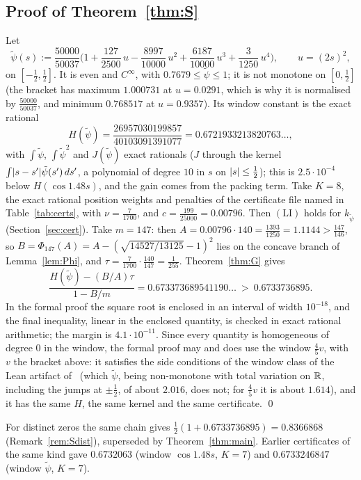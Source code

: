 \subsection{Proof of Theorem~\ref{thm:S}}
Let
\[
\tilde\psi(s):=\frac{50000}{50037}\Big(1+\frac{127}{2500}\,u-\frac{8997}{10000}\,u^2+\frac{6187}{10000}\,u^3+\frac{3}{1250}\,u^4\Big),\qquad u=(2s)^2,
\]
on $[-\frac12,\frac12]$. It is even and $C^\infty$, with $0.7679\le\tilde\psi\le1$; it is not monotone on $[0,\frac12]$ (the bracket has maximum
$1.000731$ at $u=0.0291$, which is why it is normalised by $\frac{50000}{50037}$, and minimum $0.768517$ at $u=0.9357$). Its window constant is the
exact rational
\[
H(\tilde\psi)=\frac{26957030199857}{40103091391077}=0.6721933213820763\ldots,
\]
with $\int\tilde\psi$, $\int\tilde\psi^2$ and $J(\tilde\psi)$ exact rationals ($J$ through the kernel $\int\lvert s-s'\rvert\tilde\psi(s')\,ds'$, a
polynomial of degree $10$ in $s$ on $\lvert s\rvert\le\frac12$); this is $2.5\cdot10^{-4}$ below $H(\cos1.48s)$, and the gain comes from the packing
term. Take $K=8$, the exact rational position weights and penalties of the certificate file named in Table~\ref{tab:certs}, with
$\nu=\frac7{1700}$, and $c=\frac{199}{25000}=0.00796$. Then $(\mathrm{LI})$ holds for $k_{\tilde\psi}$ (Section~\ref{sec:cert}). Take $m=147$: then
$A=0.00796\cdot140=\frac{1393}{1250}=1.1144>\frac{147}{146}$, so $B=\Phi_{147}(A)=A-(\sqrt{14527/13125}-1)^2$ lies on the concave branch of
Lemma~\ref{lem:Phi}, and $\tau=\frac{7}{1700}\cdot\frac{140}{147}=\frac1{255}$. Theorem~\ref{thm:G} gives
\[
\frac{H(\tilde\psi)-(B/A)\tau}{1-B/m}=0.673373689541190\ldots\ >\ 0.6733736895 .
\]
In the formal proof the square root is enclosed in an interval of width $10^{-18}$, and the final inequality, linear in the enclosed quantity,
is checked in exact rational arithmetic; the margin is $4.1\cdot10^{-11}$. Since every quantity is homogeneous of degree $0$ in the window, the
formal proof may and does use the window $\frac45v$, with $v$ the bracket above: it satisfies the side conditions of the window class of the
Lean artifact of~\cite{AF} (which $\tilde\psi$, being non-monotone with total variation on $\mathbb R$, including the jumps at $\pm\frac12$, of
about $2.016$, does not; for $\frac45v$ it is about $1.614$), and it has the same $H$,
the same kernel and the same certificate. \qed

\medskip
For distinct zeros the same chain gives $\frac12(1+0.6733736895)=0.8366868$ (Remark~\ref{rem:Sdist}), superseded by
Theorem~\ref{thm:main}. Earlier certificates of the same kind gave $0.6732063$ (window $\cos1.48s$, $K=7$) and $0.6733246847$
(window $\tilde\psi$, $K=7$).


